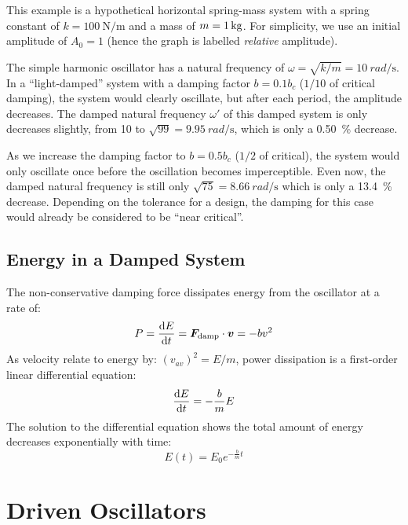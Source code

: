 This example is a hypothetical horizontal spring-mass system with a spring
constant of $k=\SI{100}{\newton\per\metre}$ and a mass of $m=\SI1{\kilo\gram}$.
For simplicity, we use an initial amplitude of $A_0=1$ (hence the graph is
labelled \emph{relative} amplitude).

The simple harmonic oscillator has a natural frequency of
$\omega=\sqrt{k/m}=\SI{10}{rad\per\second}$. In a ``light-damped'' system with
a damping factor $b=0.1b_c$ ($1/10$ of critical damping), the system would
clearly oscillate, but after each period, the amplitude decreases. The damped
natural frequency $\omega'$ of this damped system is only decreases slightly,
from 10 to $\sqrt{99}=\SI{9.95}{rad\per\second}$, which is only a
\SI{.50}{\percent} decrease.

As we increase the damping factor to $b=0.5b_c$ ($1/2$ of critical), the system
would only oscillate once before the oscillation becomes imperceptible. Even
now, the damped natural frequency is still only
$\sqrt{75}=\SI{8.66}{rad\per\second}$ which is only a \SI{13.4}{\percent}
decrease. Depending on the tolerance for a design, the damping for this case
would already be considered to be ``near critical''.



\subsection{Energy in a Damped System}
The non-conservative damping force dissipates energy from the oscillator at
a rate of:
\begin{equation}
  P=\diff Et=\bm F_\text{damp}\cdot\bm v=-bv^2
\end{equation}
As velocity relate to energy by: $(v_{av})^2=E/m$, power dissipation is a
first-order linear differential equation:
\begin{equation}
  \diff Et=-\frac bmE
\end{equation}
The solution to the differential equation shows the total amount of energy decreases
exponentially with time:
\begin{equation}
  E(t)=E_0e^{-\frac bmt} %
\end{equation}




\section{Driven Oscillators}

